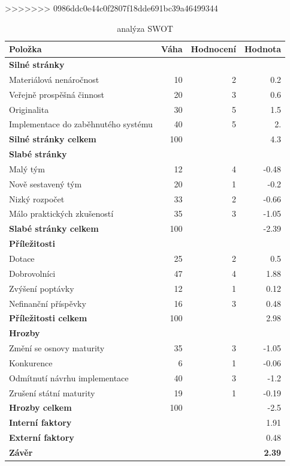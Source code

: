 \documentclass[12pt, a4paper]{report}
\begin{document}
\label{sec:org2eb4c79}
>>>>>>> 0986ddc0e44c0f2807f18dde691bc39a46499344
\begin{table}[htbp]
\caption{analýza SWOT}
\centering
\begin{tabularx}{\textwidth}{Xrrr}
Položka & Váha & Hodnocení & Hodnota\\
\hline
\textbf{Silné stránky} &  &  & \\
Materiálová nenáročnost & 10 & 2 & 0.2\\
Veřejně prospěšná činnost & 20 & 3 & 0.6\\
Originalita & 30 & 5 & 1.5\\
Implementace do zaběhnutého systému & 40 & 5 & 2.\\
\hline
\textbf{Silné stránky celkem} & 100 &  & 4.3\\
\hline
\textbf{Slabé stránky} &  &  & \\
Malý tým & 12 & 4 & -0.48\\
Nově sestavený tým & 20 & 1 & -0.2\\
Nizký rozpočet & 33 & 2 & -0.66\\
Málo praktických zkušeností & 35 & 3 & -1.05\\
\hline
\textbf{Slabé stránky celkem} & 100 &  & -2.39\\
\hline
\textbf{Příležitosti} &  &  & \\
Dotace & 25 & 2 & 0.5\\
Dobrovolníci & 47 & 4 & 1.88\\
Zvýšení poptávky & 12 & 1 & 0.12\\
Nefinanční příspěvky & 16 & 3 & 0.48\\
\hline
\textbf{Příležitosti celkem} & 100 &  & 2.98\\
\hline
\textbf{Hrozby} &  &  & \\
Změní se osnovy maturity & 35 & 3 & -1.05\\
Konkurence & 6 & 1 & -0.06\\
Odmítnutí návrhu implementace & 40 & 3 & -1.2\\
Zrušení státní maturity & 19 & 1 & -0.19\\
\hline
\textbf{Hrozby celkem} & 100 &  & -2.5\\
\hline
\textbf{Interní faktory} &  &  & 1.91\\
\textbf{Externí faktory} &  &  & 0.48\\
\hline
\textbf{Závěr} &  &  & \textbf{2.39}\\
\end{tabularx}
\end{table}
\end{document}
